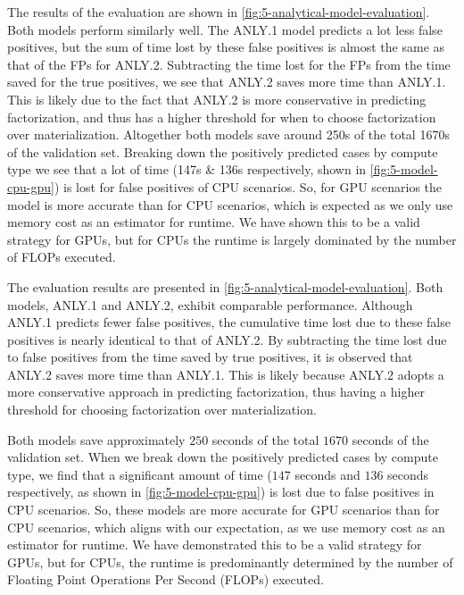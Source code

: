 The results of the evaluation are shown in \autoref{fig:5-analytical-model-evaluation}. Both models perform similarly well. The ANLY.1 model predicts a lot less false positives, but the sum of time lost by these false positives is almost the same as that of the FPs for ANLY.2. Subtracting the time lost for the FPs from the time saved for the true positives, we see that ANLY.2 saves more time than ANLY.1. This is likely due to the fact that ANLY.2 is more conservative in predicting factorization, and thus has a higher threshold for when to choose factorization over materialization. Altogether both models save around 250s of the total 1670s of the validation set. Breaking down the positively predicted cases by compute type we see that a lot of time (147s \& 136s respectively, shown in \autoref{fig:5-model-cpu-gpu}) is lost for false positives of CPU scenarios. So, for GPU scenarios the model is more accurate than for CPU scenarios, which is expected as we only use memory cost as an estimator for runtime. We have shown this to be a valid strategy for GPUs, but for CPUs the runtime is largely dominated by the number of FLOPs executed.

The evaluation results are presented in \autoref{fig:5-analytical-model-evaluation}. Both models, ANLY.1 and ANLY.2, exhibit comparable performance. Although ANLY.1 predicts fewer false positives, the cumulative time lost due to these false positives is nearly identical to that of ANLY.2. By subtracting the time lost due to false positives from the time saved by true positives, it is observed that ANLY.2 saves more time than ANLY.1. This is likely because ANLY.2 adopts a more conservative approach in predicting factorization, thus having a higher threshold for choosing factorization over materialization.

Both models save approximately $250$ seconds of the total $1670$ seconds of the validation set. When we break down the positively predicted cases by compute type, we find that a significant amount of time ($147$ seconds and $136$ seconds respectively, as shown in \autoref{fig:5-model-cpu-gpu}) is lost due to false positives in CPU scenarios. So, these models are more accurate for GPU scenarios than for CPU scenarios, which aligns with our expectation, as we use memory cost as an estimator for runtime. We have demonstrated this to be a valid strategy for GPUs, but for CPUs, the runtime is predominantly determined by the number of Floating Point Operations Per Second (FLOPs) executed.

